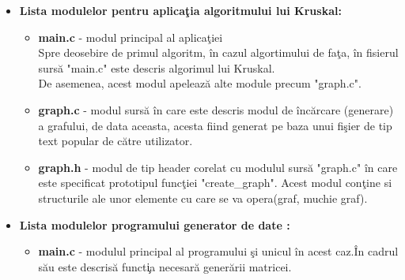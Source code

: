 \documentclass[14pt]{article}
\begin{document}
\begin{itemize}
\begin{itemize}
    
\item \textbf{Lista modulelor pentru aplica\c tia algoritmului lui Kruskal:}
\\
    \begin{itemize}
        \item \textbf{main.c} - modul principal al aplica\c tiei\\
        Spre deosebire de primul algoritm, \^in cazul algortimului de fa\c ta, \^in fisierul surs\u{a} "main.c" este descris algorimul lui Kruskal.\\
        De asemenea, acest modul apeleaz\u{a} alte module precum "graph.c".
        \item \textbf{graph.c} - modul surs\u{a} \^in care este descris modul de \^inc\u{a}rcare (generare) a grafului, de data aceasta, acesta fiind generat pe baza unui fi\c sier de tip text popular de c\u{a}tre utilizator.
        \item \textbf{graph.h} - modul de tip header corelat cu modulul surs\u{a} "graph.c" \^in care este specificat prototipul func\c tiei "create\_graph".
        Acest modul con\c tine si structurile ale unor elemente cu care se va opera(graf, muchie graf).
        \\
    \end{itemize}
    
    \item\textbf{Lista modulelor programului generator de date :}
    \\
    \begin{itemize}
        \item \textbf{main.c} - modulul principal al programului \c si unicul \^in acest caz.\^In cadrul s\u{a}u este descris\u{a} funct\c ia necesar\u{a} gener\u{a}rii matricei. 
        \\
    \end{itemize}
    \end{itemize}


\end{itemize}
\end{document}
